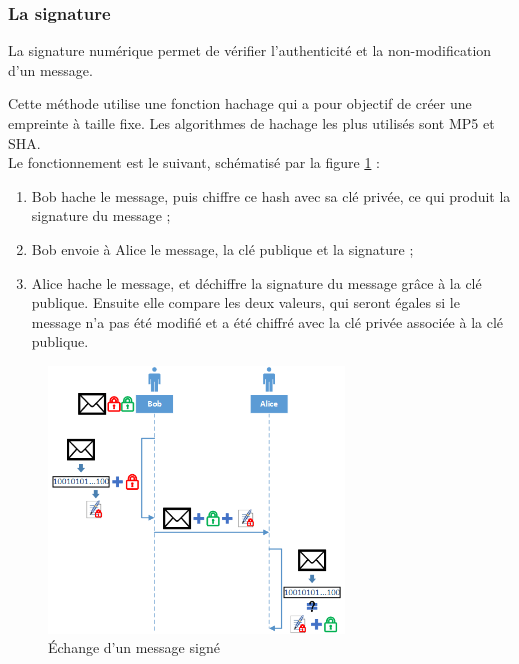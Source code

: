
\subsubsection{La signature}

La signature numérique permet de vérifier l'authenticité et la non-modification d'un message.

Cette méthode utilise une fonction hachage qui a pour objectif de créer une empreinte à taille fixe.
Les algorithmes de hachage les plus utilisés sont MP5 et SHA.
\\

Le fonctionnement est le suivant, schématisé par la figure \ref{signature} :
\begin{enumerate}
	\item Bob hache le message, puis chiffre ce hash avec sa clé privée, ce qui produit la signature du message ;
	\item Bob envoie à Alice le message, la clé publique et la signature ;
	\item Alice hache le message, et déchiffre la signature du message grâce à la clé publique. Ensuite elle compare les deux valeurs, qui seront égales si le message n'a pas été modifié et a été chiffré avec la clé privée associée à la clé publique.
\end{enumerate}
\begin{figure}[!h]
	\center
	\includegraphics[width=0.7\textwidth]{img/signature.png}
	\caption{Échange d'un message signé}
	\label{signature}
\end{figure}


